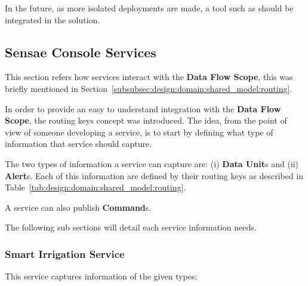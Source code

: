 In the future, as more isolated deployments are made, a tool such as  should be integrated in the solution.

\subsection{Sensae Console Services}
\label{subsec:implementation:description:services}

This section refers how services interact with the \textbf{Data Flow Scope}, this was briefly mentioned in Section~\ref{subsubsec:design:domain:shared_model:routing}.

In order to provide an easy to understand integration with the \textbf{Data Flow Scope}, the routing keys concept was introduced. The idea, from the point of view of someone developing a service, is to start by defining what type of information that service should capture.

The two types of information a service can capture are: (i) \textbf{Data Unit}s and (ii) \textbf{Alert}s. Each of this information are defined by their routing keys as described in Table~\ref{tab:design:domain:shared_model:routing}.

A service can also publish \textbf{Command}s.

The following sub sections will detail each service information needs.

\subsubsection{Smart Irrigation Service}
\label{subsubsec:implementation:description:services:irrigation}

This service captures information of the given types:

